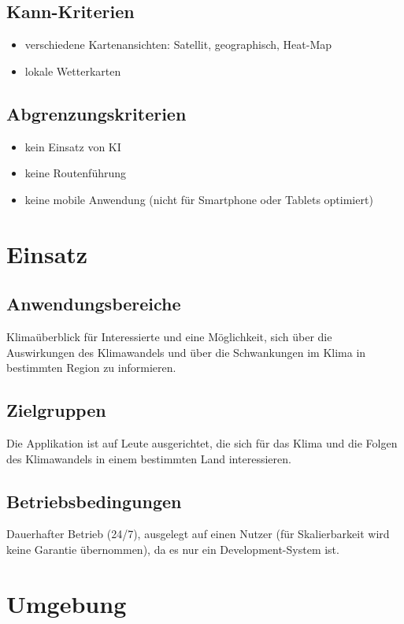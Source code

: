 \documentclass[a4paper]{scrreprt}
\begin{document}
\section{Kann-Kriterien}
\begin{itemize}
    \item verschiedene Kartenansichten: Satellit, geographisch, Heat-Map
    \item lokale Wetterkarten
\end{itemize}

\section{Abgrenzungskriterien}
\begin{itemize}
    \item kein Einsatz von KI
    \item keine Routenführung
    \item keine mobile Anwendung (nicht für Smartphone oder Tablets optimiert)
\end{itemize}

\chapter{Einsatz}
\section{Anwendungsbereiche}
Klimaüberblick für Interessierte und eine Möglichkeit, sich über die Auswirkungen des Klimawandels und über die Schwankungen im Klima in bestimmten Region zu informieren.

\section{Zielgruppen}
Die Applikation ist auf Leute ausgerichtet, die sich für das Klima und die Folgen des Klimawandels in einem bestimmten Land interessieren.

\section{Betriebsbedingungen}
Dauerhafter Betrieb (24/7), ausgelegt auf einen Nutzer (für Skalierbarkeit wird keine Garantie übernommen), da es nur ein Development-System ist.

\chapter{Umgebung}
\end{document}
